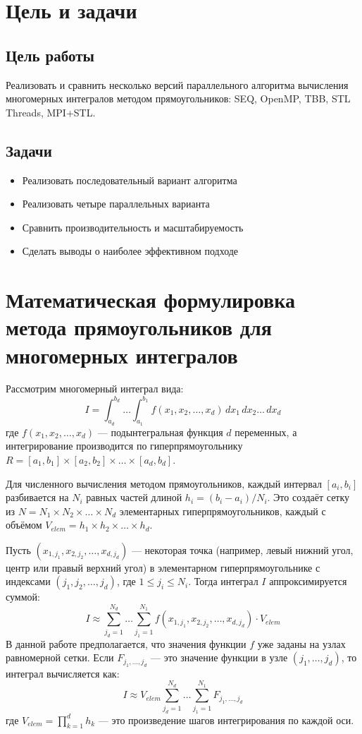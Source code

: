 \documentclass[12pt]{article}
\begin{document}
\section{Цель и задачи}
\subsection*{Цель работы}
Реализовать и сравнить несколько версий параллельного алгоритма вычисления многомерных интегралов методом прямоугольников: SEQ, OpenMP, TBB, STL Threads, MPI+STL.

\subsection*{Задачи}
\begin{itemize}
  \item Реализовать последовательный вариант алгоритма
  \item Реализовать четыре параллельных варианта
  \item Сравнить производительность и масштабируемость
  \item Сделать выводы о наиболее эффективном подходе
\end{itemize}

\section{Математическая формулировка метода прямоугольников для многомерных интегралов}
Рассмотрим многомерный интеграл вида:
\[ I = \int_{a_d}^{b_d} \dots \int_{a_1}^{b_1} f(x_1, x_2, \dots, x_d) \,dx_1 \,dx_2 \dots \,dx_d \]
где $f(x_1, x_2, \dots, x_d)$ — подынтегральная функция $d$ переменных, а интегрирование производится по гиперпрямоугольнику $R = [a_1, b_1] \times [a_2, b_2] \times \dots \times [a_d, b_d]$.

Для численного вычисления методом прямоугольников, каждый интервал $[a_i, b_i]$ разбивается на $N_i$ равных частей длиной $h_i = (b_i - a_i) / N_i$. Это создаёт сетку из $N = N_1 \times N_2 \times \dots \times N_d$ элементарных гиперпрямоугольников, каждый с объёмом $V_{elem} = h_1 \times h_2 \times \dots \times h_d$.

Пусть $(x_{1,j_1}, x_{2,j_2}, \dots, x_{d,j_d})$ — некоторая точка (например, левый нижний угол, центр или правый верхний угол) в элементарном гиперпрямоугольнике с индексами $(j_1, j_2, \dots, j_d)$, где $1 \le j_i \le N_i$.
Тогда интеграл $I$ аппроксимируется суммой:
\[ I \approx \sum_{j_d=1}^{N_d} \dots \sum_{j_1=1}^{N_1} f(x_{1,j_1}, x_{2,j_2}, \dots, x_{d,j_d}) \cdot V_{elem} \]
В данной работе предполагается, что значения функции $f$ уже заданы на узлах равномерной сетки. Если $F_{j_1, \dots, j_d}$ — это значение функции в узле $(j_1, \dots, j_d)$, то интеграл вычисляется как:
\[ I \approx V_{elem} \sum_{j_d=1}^{N_d} \dots \sum_{j_1=1}^{N_1} F_{j_1, \dots, j_d} \]
где $V_{elem} = \prod_{k=1}^{d} h_k$ — это произведение шагов интегрирования по каждой оси.
\end{document}
